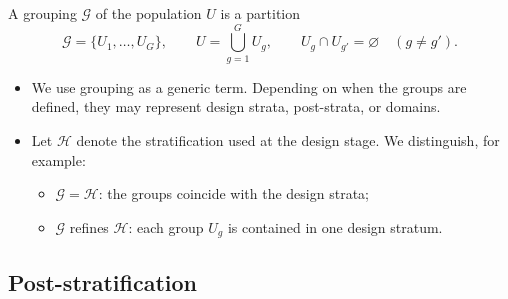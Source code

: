 \documentclass{my_eth_beamer}
\numberwithin{equation}{section}
\begin{document}
\begin{frame}
    \begin{Def}[Grouping]\label{def:group}
        A \alert{grouping} $\mathscr{G}$ of the population $U$ is a partition
        \begin{equation*}
            \mathscr{G} = \{U_1,\ldots,U_G\},
            \qquad
            U = \bigcup_{g=1}^G U_g,
            \qquad
            U_g \cap U_{g'} = \varnothing
            \quad (g\neq g').
        \end{equation*}
    \end{Def}

    \vspace{0.25em}

    \begin{itemize}
    \setlength{\itemsep}{6pt}
        \item We use \alert{grouping} as a generic term. Depending on when the
            groups are defined, they may represent design strata,
            post-strata, or domains.
        \item Let $\mathscr H$ denote the stratification used at the design
            stage. We distinguish, for example:
            \vspace{0.25em}
            \begin{itemize}
            \setlength{\itemsep}{8pt}
                \item $\mathscr G = \mathscr H$: the groups coincide with the
                    design strata;
                \item $\mathscr G$ \alert{refines} $\mathscr H$: each group
                    $U_g$ is contained in one design stratum.
            \end{itemize}
    \end{itemize}
\end{frame}

\subsection{Post-stratification}
\end{document}
